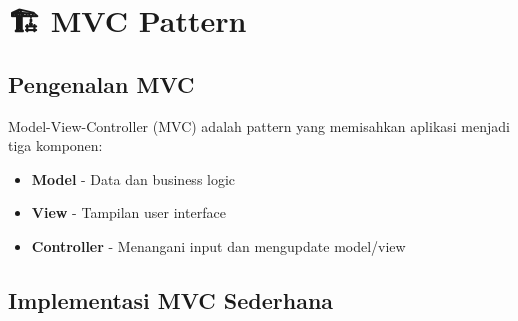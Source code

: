 \section{🏗️ MVC Pattern}

\subsection{Pengenalan MVC}

Model-View-Controller (MVC) adalah pattern yang memisahkan aplikasi menjadi tiga komponen:

\begin{itemize}
\item \textbf{Model} - Data dan business logic
\item \textbf{View} - Tampilan user interface
\item \textbf{Controller} - Menangani input dan mengupdate model/view
\end{itemize}

\subsection{Implementasi MVC Sederhana}

